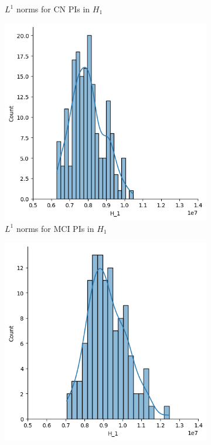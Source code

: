 \documentclass{article}
\begin{document}
\begin{figure}[htb]
\begin{subfigure}{0.32\textwidth}
    \caption{$L^1$ norms for CN PIs in $H_1$}
  \end{subfigure}
  \begin{subfigure}{0.32\textwidth}
    \includegraphics[width=\textwidth]{figures/median_pis/median_pi_MCI_H_1_displot.png}
    \caption{$L^1$ norms for MCI PIs in $H_1$}
  \end{subfigure}
  \begin{subfigure}{0.32\textwidth}
    \includegraphics[width=\textwidth]{figures/median_pis/median_pi_AD_H_1_displot.png}

\end{subfigure}
\end{figure}
\end{document}
